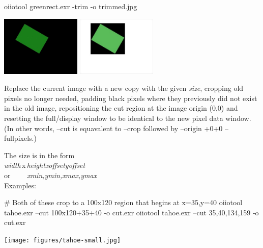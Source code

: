 \begin{code}
    oiiotool greenrect.exr -trim -o trimmed.jpg
\end{code}
\hspace{0.4in} \includegraphics[width=1.5in]{figures/pretrim.jpg}
\raisebox{40pt}{\large $\rightarrow$}
 \includegraphics[width=1.5in]{figures/trim.jpg}
\apiend

Replace the current image with a new copy with the given \emph{size},
cropping old pixels no longer needed, padding black pixels where they
previously did not exist in the old image, repositioning the cut region
at the image origin (0,0) and resetting the full/display window to be
identical to the new pixel data window.  (In other words, {\cf --cut}
is equavalent to {\cf --crop} followed by {\cf --origin +0+0 --fullpixels}.)

The size is in the form 
\\ \spc\spc \emph{width}\,{\cf x}\,\emph{height}{\cf [+-]}\emph{xoffset}{\cf
  [+-]}\emph{yoffset}
\\ or~~~~ \spc \emph{xmin,ymin,xmax,ymax} \\

\noindent Examples:

\begin{code}
    # Both of these crop to a 100x120 region that begins at x=35,y=40
    oiiotool tahoe.exr --cut 100x120+35+40 -o cut.exr
    oiiotool tahoe.exr --cut 35,40,134,159 -o cut.exr
\end{code}

\hspace{0.4in} \texttt{[image: figures/tahoe-small.jpg]}
\raisebox{40pt}{\large $\rightarrow$}
\apiend

